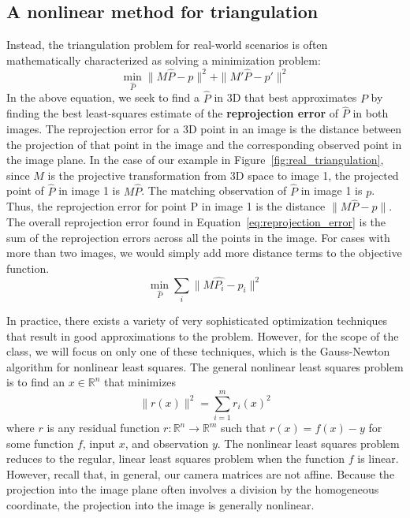 \documentclass[a4paper, 12pt]{article}
\renewcommand\emph{\textbf}
\numberwithin{equation}{section}
\begin{document}
\subsection{A nonlinear method for triangulation}
Instead, the triangulation problem for real-world scenarios is often mathematically characterized as solving a minimization problem:
\begin{equation}
    \min_{\hat{P}} \|M\hat{P}-p\|^2 + \|M'\hat{P}-p'\|^2
    \label{eq:reprojection_error}
\end{equation}
In the above equation, we seek to find a $\hat{P}$ in 3D that best approximates $P$ by finding the best least-squares estimate of the \emph{reprojection error} of $\hat{P}$ in both images. The reprojection error for a 3D point in an image is the distance between the projection of that point in the image  and the corresponding observed point in the image plane. In the case of our example in Figure~\ref{fig:real_triangulation}, since $M$ is the projective transformation from 3D space to image 1, the projected point of $\hat{P}$ in image 1 is $M\hat{P}$. The matching observation of $\hat{P}$ in image 1 is $p$. Thus, the reprojection error for point P in image 1 is the distance $\|M\hat{P} - p\|$. The overall reprojection error found in Equation~\ref{eq:reprojection_error} is the sum of the reprojection errors across all the points in the image. For cases with more than two images, we would simply add more distance terms to the objective function.
\begin{equation}
    \min_{\hat{P}} \sum_i \|M\hat{P_i}-p_i\|^2
    \label{eq:reprojection_error_multi_camera}
\end{equation}

In practice, there exists a variety of very sophisticated optimization techniques that result in good approximations to the problem. However, for the scope of the class, we will focus on only one of these techniques, which is the Gauss-Newton algorithm for nonlinear least squares. The general nonlinear least squares problem is to find an $x\in \mathbb{R}^n$ that minimizes
\begin{equation}
    \|r(x)\|^2 = \sum_{i=1}^m r_i(x)^2
\end{equation}
where $r$ is any residual function $r:\mathbb{R}^n\rightarrow \mathbb{R}^m$ such that $r(x) = f(x) - y$ for some function $f$, input $x$, and observation $y$. The nonlinear least squares problem reduces to the regular, linear least squares problem when the function $f$ is linear. However, recall that, in general, our camera matrices are not affine. Because the projection into the image plane often involves a division by the homogeneous coordinate, the projection into the image is generally nonlinear.
\end{document}
